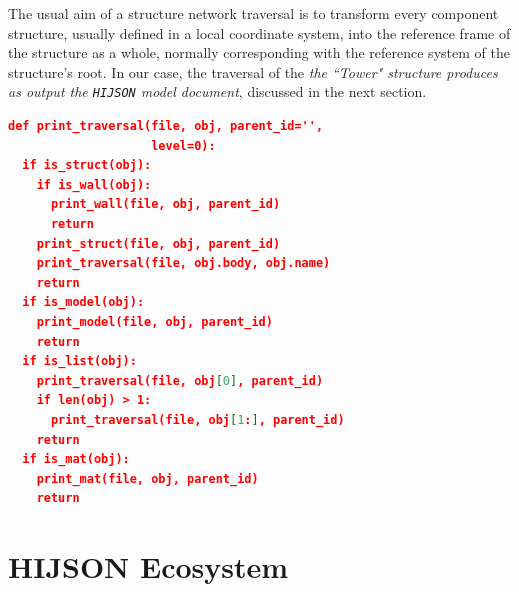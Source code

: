 \documentclass[]{egpubl}
\begin{document}
The usual aim of a structure network traversal is to transform every component structure, usually defined in a local coordinate system, into the reference frame of the structure as a whole, normally corresponding with the reference system of the structure's root. 
In our case, the traversal of the
\emph{the ``Tower" structure produces as output the \texttt{HIJSON} model document}, discussed in the next section. 

\begin{lstlisting}[language=json, label={lst:feature-collection-example}, captionpos=b,  caption=Algorithm producing a HIJSON file.]
def print_traversal(file, obj, parent_id='',
                    level=0): 
  if is_struct(obj):
    if is_wall(obj):
      print_wall(file, obj, parent_id)
      return
    print_struct(file, obj, parent_id)
    print_traversal(file, obj.body, obj.name)
    return
  if is_model(obj):
    print_model(file, obj, parent_id)
    return
  if is_list(obj):
    print_traversal(file, obj[0], parent_id)
    if len(obj) > 1:
      print_traversal(file, obj[1:], parent_id)
    return
  if is_mat(obj):
    print_mat(file, obj, parent_id)
    return
\end{lstlisting}

\section{HIJSON Ecosystem}
\end{document}
